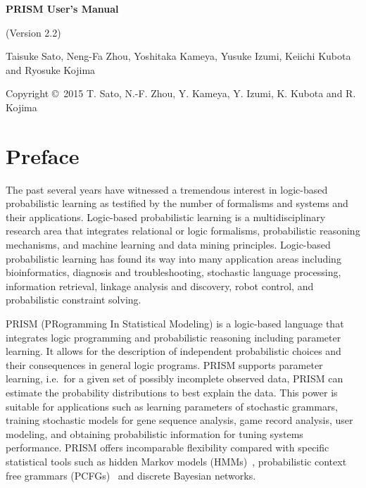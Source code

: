 \documentclass[a4paper]{report}
\begin{document}
\begin{center}
\par\vspace*{3cm}\par
{\Huge\bf PRISM User's Manual}\par\vspace*{0.5cm}\par
{\Large (Version 2.2)}\par\vspace*{12cm}\par

{\normalsize Taisuke Sato, Neng-Fa Zhou, Yoshitaka Kameya, Yusuke Izumi, Keiichi Kubota and Ryosuke Kojima}


\par\vspace*{2cm}\par

{\footnotesize Copyright \copyright~2015 T. Sato, N.-F. Zhou, Y. Kameya, Y. Izumi, K. Kubota and R. Kojima}
\end{center}
\thispagestyle{empty}
\setcounter{page}{0}%
\clearpage


\section*{Preface}

The past several years have witnessed a tremendous interest in logic-based
probabilistic learning as testified by the number of formalisms and systems
and their applications. Logic-based probabilistic learning is a multidisciplinary
research area that integrates relational or logic formalisms, probabilistic
reasoning mechanisms, and machine learning and data mining principles.
Logic-based probabilistic learning has found its way into many application
areas including bioinformatics, diagnosis and troubleshooting, stochastic
language processing, information retrieval, linkage analysis and discovery,
robot control, and probabilistic constraint solving.

PRISM (PRogramming In Statistical Modeling) is a logic-based language that
integrates logic programming and probabilistic reasoning including parameter
learning.  It allows for the description of independent probabilistic
choices and their consequences in general logic programs. PRISM supports
parameter learning, i.e.\ for a given set of possibly incomplete observed data,
PRISM can estimate the probability distributions to best explain the data.
This power is suitable for applications such as learning parameters of
stochastic grammars, training stochastic models for gene sequence analysis,
game record analysis, user modeling,
and obtaining probabilistic information for tuning systems performance.
PRISM offers incomparable flexibility compared with specific statistical
tools such as hidden Markov models (HMMs)~\cite{Charniak93,Rabiner89},
probabilistic context free grammars (PCFGs)~\cite{Charniak93}
and discrete Bayesian networks.
\end{document}
